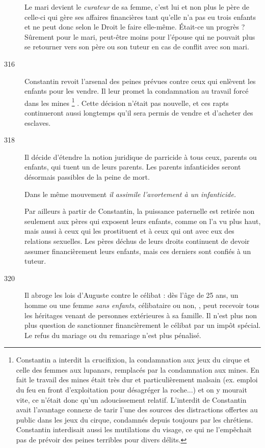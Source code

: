 \begin{description}
Le mari devient le \emph{curateur} de sa femme, c'est lui et non plus le père de celle-ci qui gère ses affaires financières tant qu'elle n'a pas eu trois enfants et ne peut donc selon le Droit le faire elle-même. Était-ce un progrès ? Sûrement pour le mari, peut-être moins pour l'épouse qui ne pouvait plus se retourner vers son père ou son tuteur en cas de conflit avec son mari.

\item[316] Constantin revoit l'arsenal des peines prévues contre ceux qui enlèvent les enfants pour les vendre. Il leur promet la condamnation au travail forcé dans les mines%
\footnote{Constantin a interdit la crucifixion, la condamnation aux jeux du cirque et celle des femmes aux lupanars, remplacés par la condamnation aux mines. En fait le travail des mines était très dur et particulièrement malsain (ex. emploi du feu en front d'exploitation pour désagréger la roche...) et on y mourait vite, ce n'était donc qu'un adoucissement relatif. L'interdit de Constantin avait l'avantage connexe de tarir l'une des sources des distractions offertes au public dans les jeux du cirque, condamnés depuis toujours par les chrétiens. Constantin interdisait aussi les mutilations du visage, ce qui ne l'empêchait pas de prévoir des peines terribles pour divers délits.}%
. Cette décision n'était pas nouvelle, et ces rapts continueront aussi longtemps qu'il sera permis de vendre et d'acheter des esclaves.

\item[318] Il décide d'étendre la notion juridique de parricide à tous ceux, parents ou enfants, qui tuent un de leurs parents. Les parents infanticides seront désormais passibles de la peine de mort. 

 Dans le même mouvement \emph{il assimile l'avortement à un infanticide.}

 Par ailleurs à partir de Constantin, la puissance paternelle est retirée non seulement aux pères qui exposent leurs enfants, comme on l'a vu plus haut, mais aussi à ceux qui les prostituent et à ceux qui ont avec eux des relations sexuelles. Les pères déchus de leurs droits continuent de devoir assumer financièrement leurs enfants, mais ces derniers sont confiés à un tuteur.

\item[320] Il abroge les lois d'Auguste contre le célibat : dès l'âge de 25 ans, un homme ou une femme \emph{sans enfants}, célibataire ou non, , peut recevoir tous les héritages venant de personnes extérieures à sa famille. Il n'est plus non plus question de sanctionner financièrement le célibat par un impôt spécial. Le refus du mariage ou du remariage n'est plus pénalisé.


\end{description}
